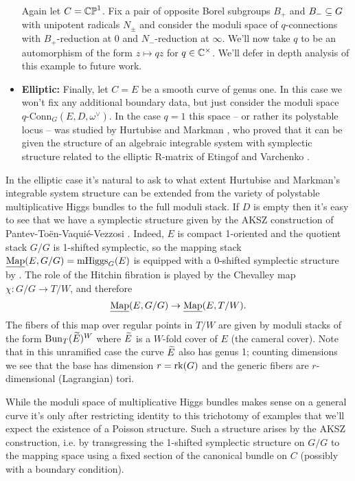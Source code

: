 \documentclass[10pt, oneside]{article}
\DeclareMathOperator{\mhiggs}{mHiggs}
\newcommand{\map}{\ul{\mr{Map}}}
\newcommand{\qconn}{q\text{-Conn}}
\begin{document}
\begin{examples}
\begin{itemize}
  Again let $C = \mathbb{CP}^1$.  Fix a pair of opposite Borel subgroups $B_+$ and $B_- \subseteq G$ with unipotent radicals $N_\pm$ and consider the moduli space of $q$-connections with $B_+$-reduction at $0$ and $N_-$-reduction at $\infty$.  We'll now take $q$ to be an automorphism of the form $z \mapsto qz$ for $q \in \mathbb{C}^\times$.  We'll defer in depth analysis of this example to future work.
  
  \item \textbf{Elliptic:} Finally, let $C = E$ be a smooth curve of genus one.  In this case we won't fix any additional boundary data, but just consider the moduli space $\qconn_G(E,D, \omega^\vee)$.  In the case $q = 1$ this space -- or rather its polystable locus -- was studied by Hurtubise and Markman \cite{HurtubiseMarkman}, who proved that it can be given the structure of an algebraic integrable system with symplectic structure related to the elliptic R-matrix of Etingof and Varchenko \cite{EtingofVarchenko}.
 \end{itemize}
\end{examples}

\begin{remark} \label{Elliptic_AKSZ_remark}
In the elliptic case it's natural to ask to what extent Hurtubise and Markman's integrable system structure can be extended from the variety of polystable multiplicative Higgs bundles to the full moduli stack.  If $D$ is empty then it's easy to see that we have a symplectic structure given by the AKSZ construction of Pantev-To\"en-Vaqui\'e-Vezzosi \cite{PTVV}.  Indeed, $E$ is compact 1-oriented and the quotient stack $G/G$ is 1-shifted symplectic, so the mapping stack $\map(E, G/G) = \mhiggs_G(E)$ is equipped with a 0-shifted symplectic structure by \cite[Theorem 2.5]{PTVV}.  The role of the Hitchin fibration is played by the Chevalley map $\chi \colon G/G \to T/W$, and therefore
\[\map(E,G/G) \to \map(E,T/W).\]
The fibers of this map over regular points in $T/W$ are given by moduli stacks of the form $\operatorname{Bun}_T(\widetilde{E})^W$ where $\widetilde{E}$ is a $W$-fold cover of $E$ (the cameral cover).  Note that in this unramified case the curve $\widetilde{E}$ also has genus 1; counting dimensions we see that the base has dimension $r = \mathrm{rk}(G)$ and the generic fibers are $r$-dimensional (Lagrangian) tori.
\end{remark}

\begin{remark}
While the moduli space of multiplicative Higgs bundles makes sense on a general curve it's only after restricting identity to this trichotomy of examples that we'll expect the existence of a Poisson structure.  Such a structure arises by the AKSZ construction, i.e. by transgressing the 1-shifted symplectic structure on $G/G$ to the mapping space using a fixed section of the canonical bundle on $C$ (possibly with a boundary condition).  
\end{remark}
\end{document}
